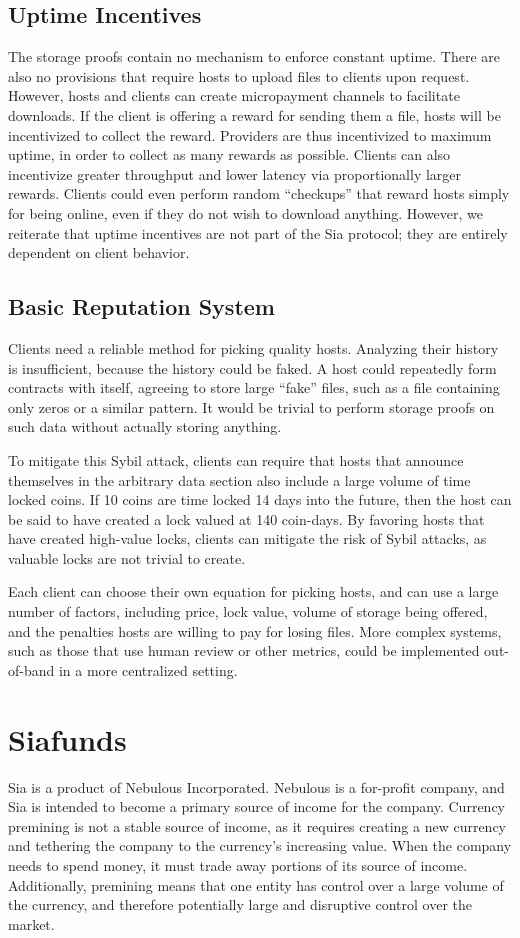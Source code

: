 \documentclass[twocolumn]{article}
\begin{document}
\subsection{Uptime Incentives}
The storage proofs contain no mechanism to enforce constant uptime.
There are also no provisions that require hosts to upload files to clients upon request.
However, hosts and clients can create micropayment channels to facilitate downloads.
If the client is offering a reward for sending them a file, hosts will be incentivized to collect the reward.
Providers are thus incentivized to maximum uptime, in order to collect as many rewards as possible.
Clients can also incentivize greater throughput and lower latency via proportionally larger rewards.
Clients could even perform random ``checkups'' that reward hosts simply for being online, even if they do not wish to download anything.
However, we reiterate that uptime incentives are not part of the Sia protocol; they are entirely dependent on client behavior.

\subsection{Basic Reputation System}
Clients need a reliable method for picking quality hosts.
Analyzing their history is insufficient, because the history could be faked.
A host could repeatedly form contracts with itself, agreeing to store large ``fake'' files, such as a file containing only zeros or a similar pattern.
It would be trivial to perform storage proofs on such data without actually storing anything.

To mitigate this Sybil attack, clients can require that hosts that announce themselves in the arbitrary data section also include a large volume of time locked coins.
If 10 coins are time locked 14 days into the future, then the host can be said to have created a lock valued at 140 coin-days.
By favoring hosts that have created high-value locks, clients can mitigate the risk of Sybil attacks, as valuable locks are not trivial to create.

Each client can choose their own equation for picking hosts, and can use a large number of factors, including price, lock value, volume of storage being offered, and the penalties hosts are willing to pay for losing files.
More complex systems, such as those that use human review or other metrics, could be implemented out-of-band in a more centralized setting.

\section{Siafunds}
Sia is a product of Nebulous Incorporated.
Nebulous is a for-profit company, and Sia is intended to become a primary source of income for the company.
Currency premining is not a stable source of income, as it requires creating a new currency and tethering the company to the currency's increasing value.
When the company needs to spend money, it must trade away portions of its source of income.
Additionally, premining means that one entity has control over a large volume of the currency, and therefore potentially large and disruptive control over the market.
\end{document}

